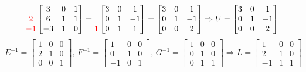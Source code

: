 \documentclass[reqno]{amsart}
\theoremstyle{definition}
\begin{document}
\begin{enumerate}
\begin{equation*}
\begin{matrix}
\\
{\color{red}2}\\
{\color{red}-1}
\end{matrix}
\begin{bmatrix}
3 & 0 & 1\\
6 & 1 & 1\\
-3 & 1 & 0
\end{bmatrix} = \begin{matrix}
\\
\\
{\color{red}1}
\end{matrix}
\begin{bmatrix}
3 & 0 & 1\\
0 & 1 & -1\\
0 & 1 & 1
\end{bmatrix} = \begin{bmatrix}
3 & 0 & 1\\
0 & 1 & -1\\
0 & 0 & 2
\end{bmatrix} \Rightarrow U = \begin{bmatrix}
3 & 0 & 1\\
0 & 1 & -1\\
0 & 0 & 2
\end{bmatrix}
\end{equation*}
%
\begin{equation*}
E^{-1} = \begin{bmatrix}
1 & 0 & 0\\
2 & 1 & 0\\
0 & 0 & 1
\end{bmatrix},\,
F^{-1} = \begin{bmatrix}
1 & 0 & 0\\
0 & 1 & 0\\
-1 & 0 & 1
\end{bmatrix},\,
G^{-1} = \begin{bmatrix}
1 & 0 & 0\\
0 & 1 & 0\\
0 & 1 & 1
\end{bmatrix} \Rightarrow
L = \begin{bmatrix}
1 & 0 & 0\\
2 & 1 & 0\\
-1 & 1 & 1
\end{bmatrix}
\end{equation*}


\end{enumerate}
\end{document}
